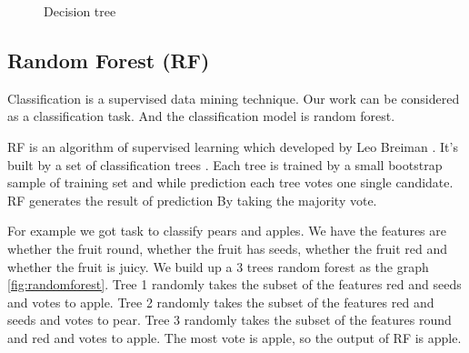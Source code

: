 \begin{figure}[!h]
\center
{}
\label{fig:DeTree}
\caption{Decision tree}
\end{figure}

\subsection{Random Forest (RF)} %
\label{random_forest}
Classification is a supervised data mining technique. Our work can be considered as a classification task. And the classification model is random forest.

RF is an algorithm of supervised learning which developed by Leo Breiman \cite{breiman2001random}. It's built by a set of classification trees \cite{breiman1984classification}. Each tree is trained by a small bootstrap sample of training set and while prediction each tree votes one single candidate. RF generates the result of prediction By taking the majority vote. 

For example we got task to classify pears and apples. We have the features are whether the fruit round, whether the fruit has seeds, whether the fruit red and whether the fruit is juicy. We build up a 3 trees random forest as the graph \ref{fig:randomforest}. Tree 1 randomly takes the subset of the features red and seeds and votes to apple. Tree 2 randomly takes the subset of the features red and seeds and votes to pear. Tree 3 randomly takes the subset of the features round and red and votes to apple. The most vote is apple, so the output of RF is apple.


